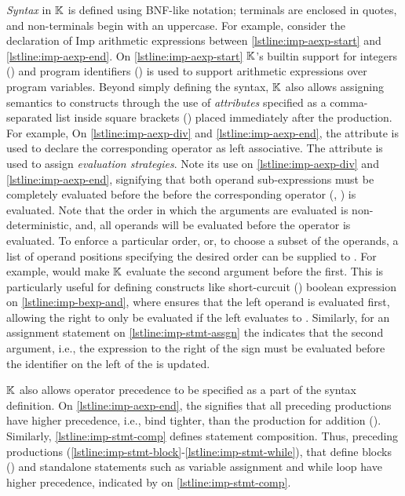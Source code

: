 \emph{Syntax} in $\mathbb{K}{}$ is defined using BNF-like notation; terminals are enclosed
in quotes, and non-terminals begin with an uppercase. For example,
consider the declaration of Imp arithmetic expressions between
\autoref{lstline:imp-aexp-start} and \autoref{lstline:imp-aexp-end}. On
\autoref{lstline:imp-aexp-start} $\mathbb{K}$'s builtin support
for integers () and program identifiers
() is used to support arithmetic expressions over program variables.
Beyond simply defining the syntax, $\mathbb{K}{}$ also allows assigning semantics to
constructs through the use of \emph{attributes} specified as a comma-separated list
inside square brackets (\inlinek{[..]}) placed immediately after the \BNF{} production.
For example, On \autoref{lstline:imp-aexp-div} and \autoref{lstline:imp-aexp-end},
the attribute  is used to declare the
corresponding operator as left associative. The  attribute is used
to assign \emph{evaluation strategies}. Note its use
on \autoref{lstline:imp-aexp-div} and \autoref{lstline:imp-aexp-end}, signifying
that both operand sub-expressions must be completely evaluated before the
before the corresponding operator (\inlinek{/}, \inlinek{+}) is evaluated.
Note that the order in which the arguments are evaluated is non-deterministic,
and, all operands will be evaluated before the operator is evaluated.
To enforce a particular order, or, to choose a subset of the operands, a
list of operand positions specifying the desired order can be supplied to
. For example,  would make $\mathbb{K}$
evaluate the second argument before the first. This is particularly
useful for defining constructs like short-curcuit (\inlineimp{&&}) boolean
expression on \autoref{lstline:imp-bexp-and}, where 
ensures that the left operand is evaluated first, allowing the right to only
be evaluated if the left evaluates to .
Similarly, for an assignment statement on \autoref{lstline:imp-stmt-assgn}
the  indicates that the second argument, i.e., the
expression to the right of the \inlineimp{=} sign must be evaluated before
the identifier on the left of the \inlineimp{=} is updated.

$\mathbb{K}{}$ also allows operator precedence to be specified as a part of the
syntax definition. On \autoref{lstline:imp-aexp-end},
the \inlinek{>} signifies that all preceding productions have higher precedence,
i.e., bind tighter, than the production for addition (\inlinek{+}).
Similarly, \autoref{lstline:imp-stmt-comp} defines statement composition.
Thus, preceding  productions
(\autoref{lstline:imp-stmt-block}-\autoref{lstline:imp-stmt-while}), that define
blocks () and standalone statements such as variable assignment and
while loop have higher precedence, indicated by \inlinek{>} on \autoref{lstline:imp-stmt-comp}.

